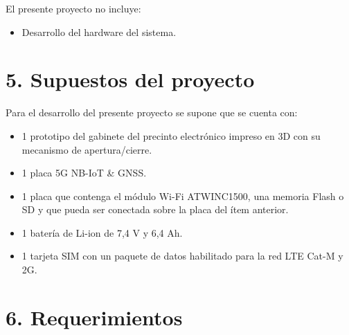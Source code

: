 \documentclass[
11pt, %
]{charter}
\begin{document}
El presente proyecto no incluye:
\begin{itemize}
\item Desarrollo del hardware del sistema.
\end{itemize}


\section{5. Supuestos del proyecto}
\label{sec:supuestos}

Para el desarrollo del presente proyecto se supone que se cuenta con:
\begin{itemize}
	\item 1 prototipo del gabinete del precinto electrónico impreso en 3D con su mecanismo de apertura/cierre.
	\item 1 placa 5G NB-IoT \& GNSS.
	\item 1 placa que contenga el módulo Wi-Fi ATWINC1500, una memoria Flash o SD y que pueda ser conectada sobre la placa del ítem anterior.
	\item 1 batería de Li-ion de 7,4 V y 6,4 Ah. 
	\item 1 tarjeta SIM con un paquete de datos habilitado para la red LTE Cat-M y 2G.
\end{itemize}

%
%

\section{6. Requerimientos}
\label{sec:requerimientos}
\end{document}
